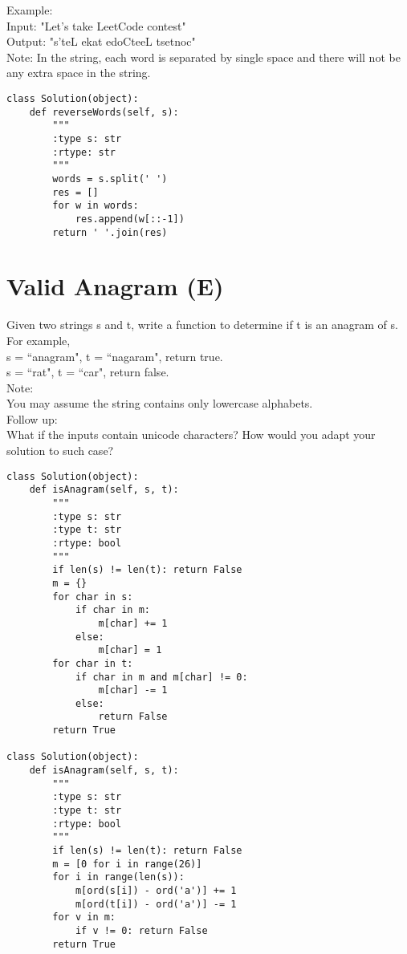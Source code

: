 Example: \\
Input: "Let's take LeetCode contest"\\
Output: "s'teL ekat edoCteeL tsetnoc"\\

Note: In the string, each word is separated by single space and there will not be any extra space in the string. \\

\begin{lstlisting}
class Solution(object):
    def reverseWords(self, s):
        """
        :type s: str
        :rtype: str
        """
        words = s.split(' ')
        res = []
        for w in words:
            res.append(w[::-1])
        return ' '.join(res)
\end{lstlisting}

\section{Valid Anagram (E)}
Given two strings s and t, write a function to determine if t is an anagram of s.\\

For example,\\
s = ``anagram", t = ``nagaram", return true.\\
s = ``rat", t = ``car", return false.\\

Note:\\
You may assume the string contains only lowercase alphabets.\\

Follow up:\\
What if the inputs contain unicode characters? How would you adapt your solution to such case?\\

\begin{lstlisting}
class Solution(object):
    def isAnagram(self, s, t):
        """
        :type s: str
        :type t: str
        :rtype: bool
        """
        if len(s) != len(t): return False
        m = {}
        for char in s:
            if char in m:
                m[char] += 1
            else:
                m[char] = 1
        for char in t:
            if char in m and m[char] != 0:
                m[char] -= 1
            else:
                return False
        return True
 
class Solution(object):
    def isAnagram(self, s, t):
        """
        :type s: str
        :type t: str
        :rtype: bool
        """
        if len(s) != len(t): return False
        m = [0 for i in range(26)]
        for i in range(len(s)):
            m[ord(s[i]) - ord('a')] += 1
            m[ord(t[i]) - ord('a')] -= 1
        for v in m:
            if v != 0: return False
        return True
\end{lstlisting}

